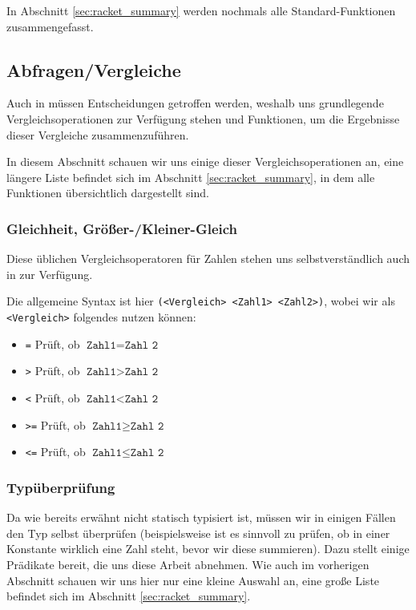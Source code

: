 	In Abschnitt \ref{sec:racket_summary} werden nochmals alle Standard-Funktionen zusammengefasst.

\subsection{Abfragen/Vergleiche}
	Auch in \racketText müssen Entscheidungen getroffen werden, weshalb uns grundlegende Vergleichsoperationen zur Verfügung stehen und Funktionen, um die Ergebnisse dieser Vergleiche zusammenzuführen.
	
	In diesem Abschnitt schauen wir uns einige dieser Vergleichsoperationen an, eine längere Liste befindet sich im Abschnitt \ref{sec:racket_summary}, in dem alle Funktionen übersichtlich dargestellt sind.

	\subsubsection{Gleichheit, Größer-/Kleiner-Gleich}
		Diese üblichen Vergleichsoperatoren für Zahlen stehen uns selbstverständlich auch in \racketText zur Verfügung.
		
		Die allgemeine Syntax ist hier \texttt{(<Vergleich> <Zahl1> <Zahl2>)}, wobei wir als \texttt{<Vergleich>} folgendes nutzen können:
		\begin{itemize}
			\item \texttt{=}  \tabto{1cm} Prüft, ob \( \texttt{Zahl1} = \texttt{Zahl 2} \)
			\item \texttt{>}  \tabto{1cm} Prüft, ob \( \texttt{Zahl1} > \texttt{Zahl 2} \)
			\item \texttt{<}  \tabto{1cm} Prüft, ob \( \texttt{Zahl1} < \texttt{Zahl 2} \)
			\item \texttt{>=} \tabto{1cm} Prüft, ob \( \texttt{Zahl1} \geq \texttt{Zahl 2} \)
			\item \texttt{<=} \tabto{1cm} Prüft, ob \( \texttt{Zahl1} \leq \texttt{Zahl 2} \)
		\end{itemize}
	
	\subsubsection{Typüberprüfung}
		Da \racketText wie bereits erwähnt nicht statisch typisiert ist, müssen wir in einigen Fällen den Typ selbst überprüfen (beispielsweise ist es sinnvoll zu prüfen, ob in einer Konstante wirklich eine Zahl steht, bevor wir diese summieren). Dazu stellt \racketText einige Prädikate bereit, die uns diese Arbeit abnehmen. Wie auch im vorherigen Abschnitt schauen wir uns hier nur eine kleine Auswahl an, eine große Liste befindet sich im Abschnitt \ref{sec:racket_summary}.
	
